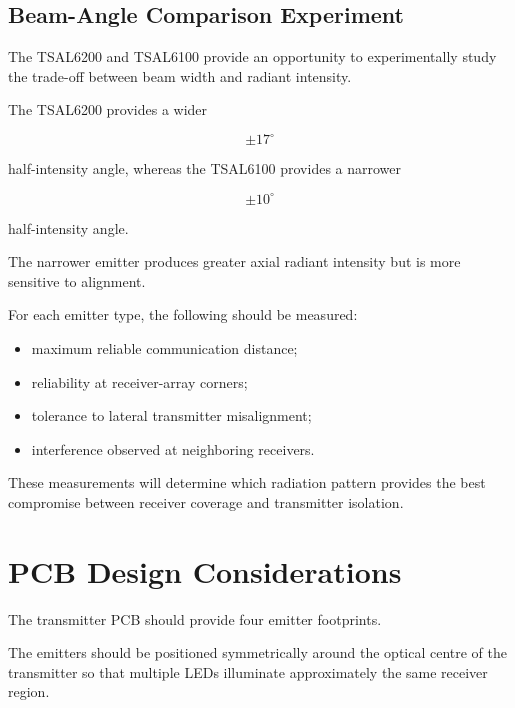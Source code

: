 \documentclass[a4paper,12pt]{article}
\begin{document}
\subsection{Beam-Angle Comparison Experiment}

The TSAL6200 and TSAL6100 provide an opportunity to experimentally
study the trade-off between beam width and radiant intensity.

The TSAL6200 provides a wider

\[
\pm17^\circ
\]

half-intensity angle, whereas the TSAL6100 provides a narrower

\[
\pm10^\circ
\]

half-intensity angle.

The narrower emitter produces greater axial radiant intensity but is
more sensitive to alignment.

For each emitter type, the following should be measured:

\begin{itemize}

    \item maximum reliable communication distance;

    \item reliability at receiver-array corners;

    \item tolerance to lateral transmitter misalignment;

    \item interference observed at neighboring receivers.

\end{itemize}

These measurements will determine which radiation pattern provides the
best compromise between receiver coverage and transmitter isolation.



\section{PCB Design Considerations}

The transmitter PCB should provide four emitter footprints.

The emitters should be positioned symmetrically around the optical
centre of the transmitter so that multiple LEDs illuminate
approximately the same receiver region.
\end{document}
